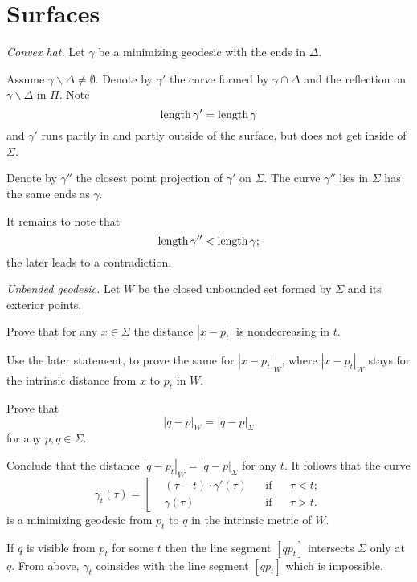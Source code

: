 
\section*{Surfaces}

\textit{Convex hat.}
Let $\gamma$ be a minimizing geodesic with the ends in $\Delta$.

Assume $\gamma\backslash\Delta\ne\emptyset$.
Denote by $\gamma'$ the curve formed by $\gamma\cap \Delta$ 
and the reflection on $\gamma\backslash\Delta$ in $\Pi$.
Note 
\[\operatorname{\rm length}\gamma'=\operatorname{\rm length}\gamma\]
and $\gamma'$ runs partly in and partly outside of the surface, but does not get inside of $\Sigma$.

Denote by $\gamma''$ the closest point projection of $\gamma'$ on $\Sigma$.
The curve $\gamma''$ lies in $\Sigma$ has the same ends as $\gamma$.

It remains to note that 
\[\operatorname{\rm length}\gamma''<\operatorname{\rm length}\gamma;\]
the later leads to a contradiction.

 



\textit{Unbended geodesic.}
Let $W$ be the closed unbounded set formed by $\Sigma$ and its exterior points.

Prove that for any $x\in\Sigma$ the distance $|x - p_t|$ is nondecreasing in $t$.

Use the later statement, to prove the same for $|x - p_t|_W$,
where $|x - p_t|_W$ stays for the intrinsic distance from $x$ to $p_t$ in $W$.

Prove that 
\[|q - p|_W=|q - p|_\Sigma\] 
for any $p,q\in\Sigma$.


Conclude that the distance $|q - p_t|_W=|q - p|_\Sigma$
for any $t$.
It follows that the curve 
$$\gamma_t(\tau)=\left[
\begin{aligned}
&(\tau-t)\cdot\gamma'(\tau)&&\text{if}&&\tau< t;
\\
&\gamma(\tau)&&\text{if}&&\tau> t.
\end{aligned}
\right.$$
is a minimizing geodesic from $p_t$ to $q$ in the intrinsic metric of $W$. 

If $q$ is visible from $p_t$ for some $t$ then the line segment $[qp_t]$ intersects $\Sigma$ only at $q$.
From above, 
$\gamma_t$  coinsides with the line segment $[qp_t]$ which is impossible.

